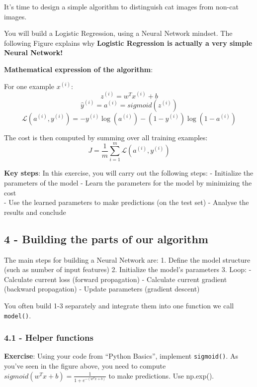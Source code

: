 \documentclass[11pt]{article}
\begin{document}
It's time to design a simple algorithm to distinguish cat images from
non-cat images.

You will build a Logistic Regression, using a Neural Network mindset.
The following Figure explains why \textbf{Logistic Regression is
actually a very simple Neural Network!}

\textbf{Mathematical expression of the algorithm}:

For one example $x^{(i)}$: \[z^{(i)} = w^T x^{(i)} + b \tag{1}\]
\[\hat{y}^{(i)} = a^{(i)} = sigmoid(z^{(i)})\tag{2}\]
\[ \mathcal{L}(a^{(i)}, y^{(i)}) =  - y^{(i)}  \log(a^{(i)}) - (1-y^{(i)} )  \log(1-a^{(i)})\tag{3}\]

The cost is then computed by summing over all training examples:
\[ J = \frac{1}{m} \sum_{i=1}^m \mathcal{L}(a^{(i)}, y^{(i)})\tag{6}\]

\textbf{Key steps}: In this exercise, you will carry out the following
steps: - Initialize the parameters of the model - Learn the parameters
for the model by minimizing the cost\\ - Use the learned parameters to
make predictions (on the test set) - Analyse the results and conclude

    \subsection{4 - Building the parts of our
algorithm}\label{building-the-parts-of-our-algorithm}

The main steps for building a Neural Network are: 1. Define the model
structure (such as number of input features) 2. Initialize the model's
parameters 3. Loop: - Calculate current loss (forward propagation) -
Calculate current gradient (backward propagation) - Update parameters
(gradient descent)

You often build 1-3 separately and integrate them into one function we
call \texttt{model()}.

\subsubsection{4.1 - Helper functions}\label{helper-functions}

\textbf{Exercise}: Using your code from ``Python Basics'', implement
\texttt{sigmoid()}. As you've seen in the figure above, you need to
compute $sigmoid( w^T x + b) = \frac{1}{1 + e^{-(w^T x + b)}}$ to make
predictions. Use np.exp().
\end{document}
